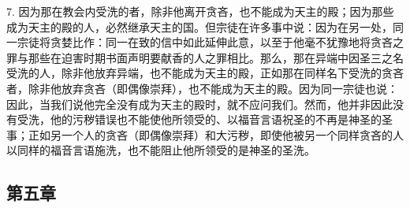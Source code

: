 7. 因为那在教会内受洗的者，除非他离开贪吝，也不能成为天主的殿；因为那些成为天主的殿的人，必然继承天主的国。但宗徒在许多事中说：因为在另一处，同一宗徒将贪婪比作：同一在致的信中如此延伸此意，以至于他毫不犹豫地将贪吝之罪与那些在迫害时期书面声明要献香的人之罪相比。那么，那在异端中因圣三之名受洗的人，除非他放弃异端，也不能成为天主的殿，正如那在同样名下受洗的贪吝者，除非他放弃贪吝（即偶像崇拜），也不能成为天主的殿。因为同一宗徒也说：因此，当我们说他完全没有成为天主的殿时，就不应问我们。然而，他并非因此没有受洗，他的污秽错误也不能使他所领受的、以福音言语祝圣的不再是神圣的圣事；正如另一个人的贪吝（即偶像崇拜）和大污秽，即使他被另一个同样贪吝的人以同样的福音言语施洗，也不能阻止他所领受的是神圣的圣洗。\par


\subsection{第五章}

